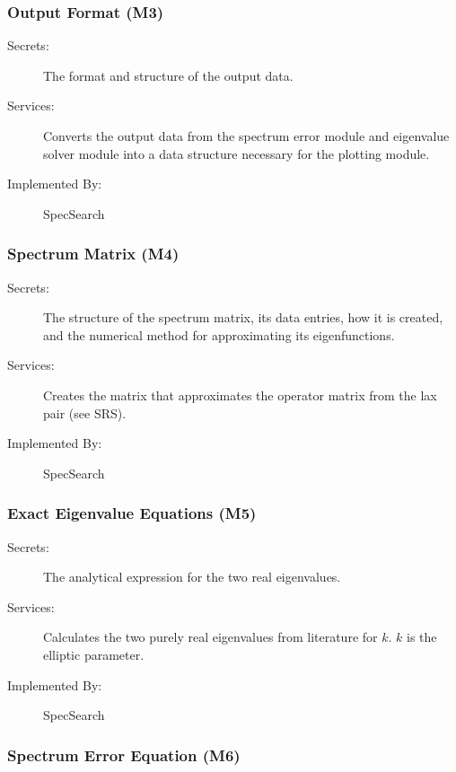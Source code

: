 \documentclass[12pt, titlepage]{article}
\begin{document}
	\subsubsection{Output Format (M3)}
	
	\begin{description}
		\item[Secrets:] The format and structure of the output data.
		\item[Services:] Converts the output data from the spectrum error 
		module 
		and eigenvalue solver module into a data structure necessary for the 
		plotting module. 
		\item[Implemented By:] SpecSearch
	\end{description}
	
	\subsubsection{Spectrum Matrix (M4)}
	
	\begin{description}
		\item[Secrets:]The structure of the spectrum matrix, its data entries, 
		how 
		it is created, and the numerical method for approximating its 
		eigenfunctions. 
		\item[Services:]Creates the matrix that approximates the operator 
		matrix 
		from the lax pair (see SRS).  
		\item[Implemented By:] SpecSearch
	\end{description}
	
	\subsubsection{Exact Eigenvalue Equations (M5)}
	
	\begin{description}
		\item[Secrets:]The analytical expression for the two real eigenvalues. 
		\item[Services:]Calculates the two purely real eigenvalues from 
		literature for $k$. $k$ is the elliptic parameter. 
		\item[Implemented By:] SpecSearch
	\end{description}
	
	\subsubsection{Spectrum Error Equation (M6)}
	
\end{document}
